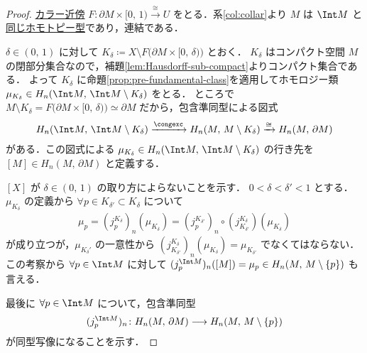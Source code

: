 \documentclass[algtopo_main]{subfiles}
\begin{document}
\begin{proof}
    \hyperref[thm:collar]{カラー近傍} $F \colon \partial M \times [0,\, 1) \xrightarrow{\cong} U$ をとる．系\ref{col:collar}より $M$ は $\Int M$ と\hyperref[def:homotopic]{同じホモトピー型}であり，連結である．

    $\delta \in (0,\, 1)$ に対して $K_\delta \coloneqq X \setminus F \bigl( \partial M \times [0,\, \delta) \bigr)$ とおく．
    $K_\delta$ はコンパクト空間 $M$ の閉部分集合なので，補題\ref{lem:Hausdorff-sub-compact}よりコンパクト集合である．
    よって $K_\delta$ に命題\ref{prop:pre-fundamental-class}を適用してホモロジー類 $\mu_{K_\delta} \in H_n (\Int M,\, \Int M \setminus K_\delta)$ をとる．
    ところで $M \setminus K_\delta = F \bigl( \partial M \times [0,\, \delta) \bigr) \simeq \partial M$ だから，包含準同型による図式
    \begin{align}
        H_n (\Int M,\, \Int M \setminus K_\delta) \xrightarrow{\congexc} H_n (M,\, M \setminus K_\delta) \xrightarrow{\cong} H_n (M,\, \partial M)
    \end{align}
    がある．この図式による $\mu_{K_\delta} \in H_n (\Int M,\, \Int M \setminus K_\delta)$ の行き先を $[M] \in H_n (M,\, \partial M)$ と定義する．
    
    $[X]$ が $\delta \in (0,\, 1)$ の取り方によらないことを示す．
    $0 < \delta < \delta' < 1$ とする．$\mu_{K_{\delta}}$ の定義から $\forall  p \in K_{\delta'} \subset K_\delta$ について
    \begin{align}
        \mu_p = (j_p^{K_\delta})_n (\mu_{K_\delta}) = (j_p^{K_{\delta'}})_n \circ (j_{K_{\delta'}}^{K_\delta})(\mu_{K_\delta})
    \end{align}
    が成り立つが，$\mu_{K_\delta'}$ の一意性から
    $(j_{K_{\delta'}}^{K_\delta})_n (\mu_{K_\delta}) = \mu_{K_{\delta'}}$ でなくてはならない．
    この考察から $\forall p \in \Int M$ に対して $(j_p^{\Int M})_n ([M]) = \mu_p \in H_n (M,\, M \setminus \{p\})$ も言える．

    最後に $\forall p \in \Int M$ について，包含準同型
    \begin{align}
        (j_p^{\Int M})_n \colon H_n (M,\, \partial M) \lto H_n (M,\, M \setminus\{p\})
    \end{align}
    が同型写像になることを示す．
\end{proof}
\end{document}
